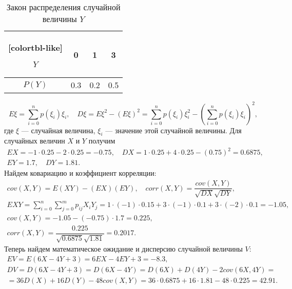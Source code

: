\documentclass[12pt, a4paper]{article}
\begin{document}
			\vspace*{-1mm}
			\begin{table}[!h]
				\centering
				\caption{\label{table_Y} Закон распределения случайной величины $Y$}
				\vspace*{2mm}
				\begin{NiceTabular}{|c|c|c|c|}[colortbl-like]
					
					\hline
					$Y$
					& 0
					& 1
					& 3 \\
					
					\hline
					$P(Y)$
					& 0.3
					& 0.2
					& 0.5\\
					
					\hline
				\end{NiceTabular}
				\label{table: Y}				
			\end{table}		
			\vspace*{2mm}
			
			$$
				E\xi = \sum_{i=0}^{n} p(\xi_i) \xi_i, 
				\quad 
				D\xi = E\xi^2 - (E\xi)^2 = \sum_{i=0}^{n} p(\xi_i) \xi_i^2 - \left( \sum_{i=0}^{n} p(\xi_i) \xi_i \right)^2,
			$$
			где $\xi$ --- случайная величина, $\xi_i$ --- значение этой случайной величины. Для случайных величин $X$ и $Y$ получим
			\begin{gather*}
				EX = -1 \cdot 0.25 - 2 \cdot 0.25 = - 0.75,
				\quad DX = 1 \cdot 0.25 + 4 \cdot 0.25 - (0.75)^2 = 0.6875, \\
				EY = 1.7, \quad DY = 1.81.
			\end{gather*}
			Найдем ковариацию и коэффициент корреляции: 
			\begin{gather*}
				cov(X, Y) = E(XY)- (EX) (EY),
				\quad
				corr(X, Y) = \dfrac{cov(X, Y)}{\sqrt{DX} \sqrt{DY}}, \\
				EXY = \sum_{i=0}^{n} \sum_{j=0}^{m} p_{ij} X_i Y_j  = 
				1 \cdot (-1) \cdot 0.15 + 3 \cdot (-1) \cdot 0.1 + 3 \cdot (-2) \cdot 0.1 = -1.05, \\
				cov(X, Y) = -1.05 - (-0.75) \cdot 1.7 = 0.225, \\
				corr(X, Y) = \dfrac{0.225}{\sqrt{0.6875} \sqrt{1.81}} =  0.2017.
			\end{gather*}
			Теперь найдем математическое ожидание и дисперсию случайной величины $V$: 
			\begin{gather*}
				EV = E(6X - 4Y + 3) = 6EX -4EY + 3 = -8.3,\\
				DV = D(6X - 4Y + 3) = D(6X - 4Y) = D(6X) + D(4Y) - 2 cov(6X, 4Y) = \\
				= 36 D(X) + 16 D(Y) - 48 cov(X, Y) = 
				36 \cdot 0.6875 + 16 \cdot 1.81 - 48 \cdot 0.225 = 42.91.
			\end{gather*}
			
\end{document}
